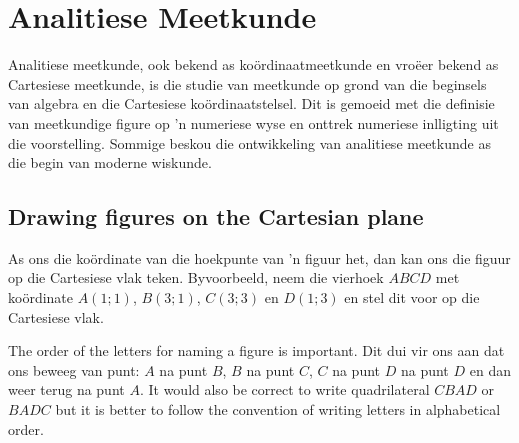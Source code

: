 \chapter{Analitiese Meetkunde}
Analitiese meetkunde, ook bekend as koördinaatmeetkunde en vroëer bekend as Cartesiese meetkunde, is die studie van meetkunde op grond van die beginsels van algebra en die Cartesiese koördinaatstelsel. Dit is gemoeid met die definisie van meetkundige figure op ’n numeriese wyse en onttrek numeriese inlligting uit die voorstelling. Sommige beskou die ontwikkeling van analitiese meetkunde as die begin van moderne wiskunde.

\par 
{}

\section{Drawing figures on the Cartesian plane}
As ons die koördinate van die hoekpunte van ’n figuur het, dan kan ons die figuur op die Cartesiese vlak teken.
Byvoorbeeld, neem die vierhoek $ABCD$ met koördinate $A(1;1)$, $B(3;1)$, $C(3;3)$ en $D(1;3)$ en stel dit voor op die Cartesiese vlak. 

\par 

\setcounter{subfigure}{0}
\begin{figure}[H] %
\begin{center}
\end{center}
\label{fig:cartesianplane}
\end{figure} 

The order of the letters for naming a figure is important. Dit dui vir ons aan dat ons beweeg van punt: $A$ na punt $B$, $B$ na punt $C$, $C$ na punt $D$ na punt $D$  en dan weer terug na punt  $A$. It would also be correct to write quadrilateral $CBAD$ or $BADC$ but it is better to follow the convention of writing letters in alphabetical order.     

